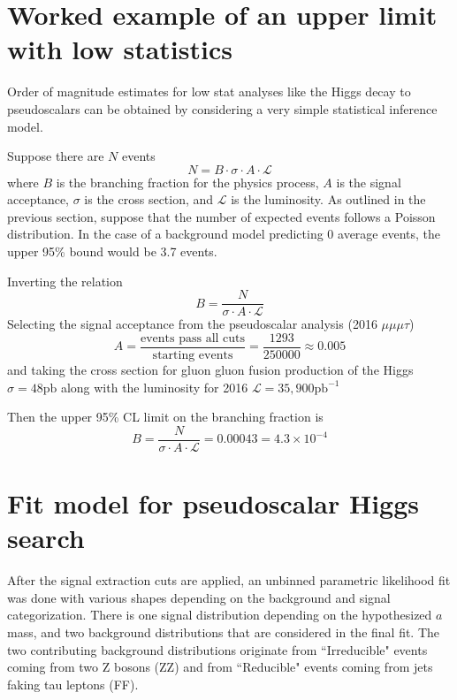 \section{Worked example of an upper limit with low statistics}
Order of magnitude estimates for low stat analyses like the Higgs decay to pseudoscalars can be obtained by considering a very simple statistical inference model. 

Suppose there are $N$ events 
\begin{equation}
\label{eq:Nevents}
N = B\cdot \sigma \cdot A\cdot \mathcal{L}
\end{equation}
where $B$ is the branching fraction for the physics process, $A$ is the signal acceptance, $\sigma$ is the cross section, and $\mathcal{L}$ is the luminosity.
As outlined in the previous section, suppose that the number of expected events follows a Poisson distribution. In the case of a background model predicting 0 average events, the upper 95\% bound would be 3.7 events. 

Inverting the relation
\begin{equation}B = \frac{N}{\sigma \cdot A\cdot \mathcal{L}}\end{equation}
Selecting the signal acceptance from the pseudoscalar analysis (2016 $\mu\mu\mu\tau$) 
\begin{equation} A = \frac{\text{events pass all cuts}}{\text{starting events}} = \frac{1293}{250000} \approx 0.005 \end{equation}
and taking the cross section for gluon gluon fusion production of the Higgs $\sigma = 48 \text{pb}$ along with the luminosity for 2016 $\mathcal{L} = 35,900 \text{pb}^{-1}$

Then the upper 95\% CL limit on the branching fraction is 
\begin{equation}B =  \frac{N}{\sigma \cdot A\cdot \mathcal{L}} = 0.00043 = 4.3 \times 10^{-4}\end{equation}



\section{Fit model for pseudoscalar Higgs search}
\label{sec:fitmodel}
After the signal extraction cuts are applied, an unbinned parametric likelihood fit was done with various shapes depending on the background and signal categorization. There is one signal distribution depending on the hypothesized $a$ mass, and two background distributions that are considered in the final fit. The two contributing background distributions originate from ``Irreducible" events coming from two Z bosons (ZZ) and from ``Reducible" events coming from jets faking tau leptons (FF).  

